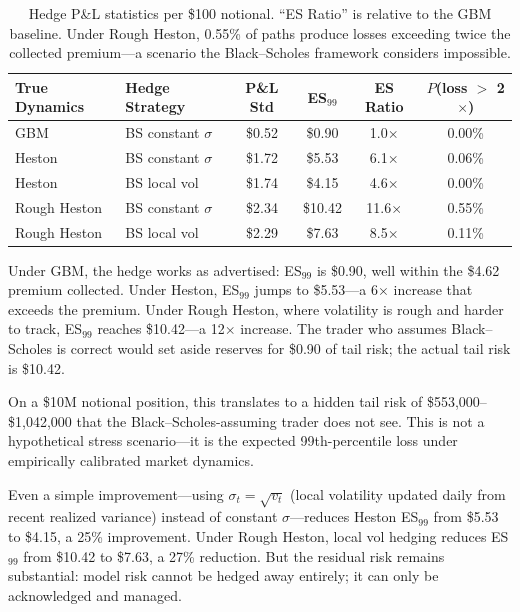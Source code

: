 \documentclass[11pt,a4paper]{article}
\begin{document}
\begin{table}[H]
\centering
\begin{tabular}{llcccc}
\toprule
\textbf{True Dynamics} & \textbf{Hedge Strategy} & \textbf{P\&L Std} & \textbf{ES$_{99}$} & \textbf{ES Ratio} & \textbf{$P$(loss $>$ 2$\times$)} \\
\midrule
GBM            & BS constant $\sigma$ & \$0.52 & \$0.90  & 1.0$\times$ & 0.00\% \\
Heston         & BS constant $\sigma$ & \$1.72 & \$5.53  & 6.1$\times$ & 0.06\% \\
Heston         & BS local vol         & \$1.74 & \$4.15  & 4.6$\times$ & 0.00\% \\
Rough Heston   & BS constant $\sigma$ & \$2.34 & \$10.42 & 11.6$\times$ & 0.55\% \\
Rough Heston   & BS local vol         & \$2.29 & \$7.63  & 8.5$\times$ & 0.11\% \\
\bottomrule
\end{tabular}
\caption{Hedge P\&L statistics per \$100 notional. ``ES Ratio'' is relative to the GBM baseline. Under Rough Heston, 0.55\% of paths produce losses exceeding twice the collected premium---a scenario the Black--Scholes framework considers impossible.}
\label{tab:hedging}
\end{table}

Under GBM, the hedge works as advertised: ES$_{99}$ is \$0.90, well within the \$4.62 premium collected. Under Heston, ES$_{99}$ jumps to \$5.53---a 6$\times$ increase that exceeds the premium. Under Rough Heston, where volatility is rough and harder to track, ES$_{99}$ reaches \$10.42---a 12$\times$ increase. The trader who assumes Black--Scholes is correct would set aside reserves for \$0.90 of tail risk; the actual tail risk is \$10.42.

On a \$10M notional position, this translates to a hidden tail risk of \$553{,}000--\$1{,}042{,}000 that the Black--Scholes-assuming trader does not see. This is not a hypothetical stress scenario---it is the expected 99th-percentile loss under empirically calibrated market dynamics.

Even a simple improvement---using $\sigma_t = \sqrt{v_t}$ (local volatility updated daily from recent realized variance) instead of constant $\sigma$---reduces Heston ES$_{99}$ from \$5.53 to \$4.15, a 25\% improvement. Under Rough Heston, local vol hedging reduces ES$_{99}$ from \$10.42 to \$7.63, a 27\% reduction. But the residual risk remains substantial: model risk cannot be hedged away entirely; it can only be acknowledged and managed.
\end{document}
